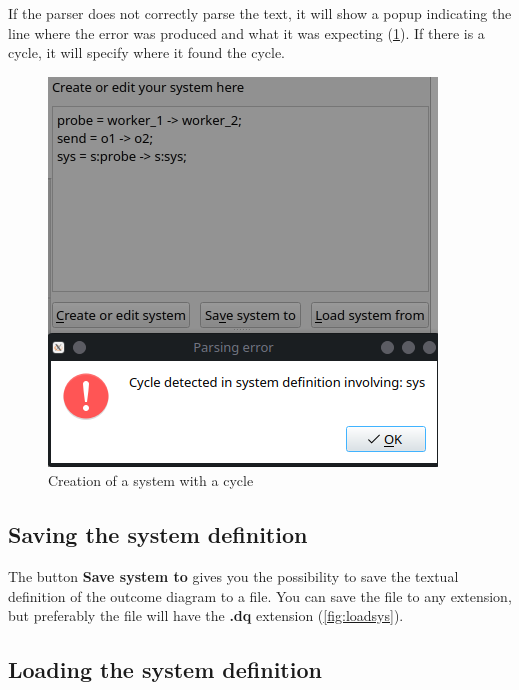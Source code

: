     If the parser does not correctly parse the text, it will show a popup indicating the line where the error was produced and what it was expecting (\cref{fig:syserr}). If there is a cycle, it will specify where it found the cycle.  
     
    \begin{figure}[H]
        \begin{center}
            \includegraphics[width = \textwidth]{img/manual/cycle.png}
        \end{center}
        \caption{Creation of a system with a cycle}
        \label{fig:syserr}
    \end{figure}


    \subsection{Saving the system definition}

    The button \textbf{Save system to} gives you the possibility to save the textual definition of the outcome diagram to a file. You can save the file to any extension, but preferably the file will have the \textbf{.dq} extension (\cref{fig:loadsys}).

    \subsection{Loading the system definition}

